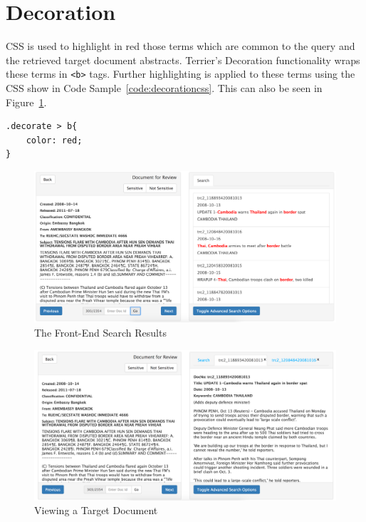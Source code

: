 \documentclass{l4proj}
\newcommand{\code}[1]{\texttt{#1}}
\newenvironment{codelisting}{\captionsetup{type=listing}}{}
\begin{document}
\section{Decoration} \label{client_decoration}
CSS is used to highlight in red those terms which are common to the query and the retrieved target document abstracts. Terrier's Decoration functionality wraps these terms in \code{<b>} tags. Further highlighting is applied to these terms using the CSS show in Code Sample~\ref{code:decorationcss}. This can also be seen in Figure~\ref{relevant_results_full}.
\begin{codelisting}
\begin{verbatim}
.decorate > b{
    color: red;
}
\end{verbatim}
\label{code:decorationcss}
\end{codelisting}

\begin{figure}[H]
\centering
\includegraphics[scale=0.30]{images/searchresults}
\caption{The Front-End Search Results}
\label{relevant_results_full}
\end{figure}
\begin{figure}[H]
\centering
\includegraphics[scale=0.30]{images/targetdocument}
\caption{Viewing a Target Document}
\label{target_doc_view}
\end{figure}
\end{document}
